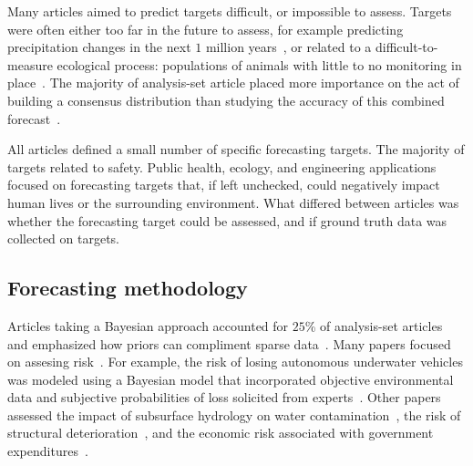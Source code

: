 \documentclass[preprint]{elsarticle}
\begin{document}
Many articles aimed to predict targets difficult, or impossible to assess.
Targets were often either too far in the future to assess, for example predicting precipitation changes in the next $1$ million years~\cite{zio1997accounting}, or related to a difficult-to-measure ecological process: populations of animals with little to no monitoring in place~\cite{johnson2018making,borsuk2004predictive,mantyka2014understanding}.
The majority of analysis-set article placed more importance on the act of building a consensus distribution than studying the accuracy of this combined forecast~\cite{johnson2018making,cooke2014out,li2012preliminary,klas2010support,zio1997accounting,song2013combining,clemen2007advances,tartakovsky2007probabilistic,morgan2014use,borsuk2004predictive,kabak2008aggregating,cabello2012combination,adams2009acceptability,neves2008life,failing2004using,evans1994use,hora2015calibration,abramson1996hailfinder,hathout2016uncertainty,wang2008probabilistic,mantyka2014understanding,kurowicka2010probabilistic,zio1996use,brito2016bayesian,gu2016expert,mu1999multi,wang2018bayesian,shin2013robust,brito2012behavioral,baron2014two}.

All articles defined a small number of specific forecasting targets.
The majority of targets related to safety.
Public health, ecology, and engineering applications focused on forecasting targets that, if left unchecked, could negatively impact human lives or the surrounding environment.
What differed between articles was whether the forecasting target could be assessed, and if ground truth data was collected on targets.

\subsection{Forecasting methodology}

Articles taking a Bayesian approach accounted for $25$\% of analysis-set articles and emphasized how priors can compliment sparse data~\cite{zio1997accounting,bolger2017deriving,ISI:000296286100010,tartakovsky2007probabilistic,huang2016improving,neves2008life,abramson1996hailfinder,ren2002optimal,mantyka2014understanding,brito2016bayesian,wang2018bayesian,brito2012behavioral}.
Many papers focused on assesing risk~\cite{zio1997accounting,brito2016bayesian,brito2012behavioral,tartakovsky2007probabilistic}.
For example, the risk of losing autonomous underwater vehicles was modeled using a Bayesian model that incorporated objective environmental data and subjective probabilities of loss solicited from experts~\cite{brito2016bayesian,brito2012behavioral}.
Other papers assessed the impact of subsurface hydrology on water contamination~\cite{tartakovsky2007probabilistic}, the risk of structural deterioration~\cite{neves2008life}, and the economic risk associated with government expenditures~\cite{wang2018bayesian}.
\end{document}
